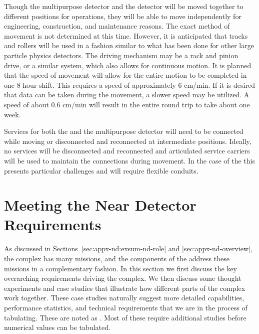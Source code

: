 Though the multipurpose detector and the  detector will be moved together to different positions for operations, they will be able to move independently for engineering, construction, and maintenance reasons.  The exact method of movement is not determined at this time. However, it is anticipated that tracks and rollers will be used in a fashion similar to what has been done for other large particle physics detectors. The driving mechanism may be a rack and pinion drive, or a similar system, which also allows for continuous motion. 
It is planned that the speed of movement will allow for the entire motion to be completed in one 8-hour shift. This requires a speed of approximately 6 cm/min. If it is desired that data can be taken during the movement, a slower speed may be utilized. A speed of about 0.6 cm/min will result in the entire round trip to take about one week. 

Services for both the  and the multipurpose detector will need to be connected while moving or disconnected and reconnected at intermediate positions. Ideally, no services will be disconnected and reconnected and articulated service carriers will be used to maintain the connections during movement. In the case of the  this presents particular challenges and will require flexible conduits. 




\chapter{Meeting the Near Detector Requirements}
\label{sec:appx-nd:requirements}

As discussed in Sections~\ref{sec:appx-nd:exsum-nd-role} and \ref{sec:appx-nd-overview}, the    complex has many missions, and the components of the    address these missions in a complementary fashion. In this section we first discuss the key overarching requirements driving the  complex. We then discuss some thought experiments and case studies that illustrate how different parts of the complex work together. These case studies naturally suggest more detailed capabilities, performance statistics, and technical requirements that we are in the process of tabulating. These are noted as . Most of these require additional studies before numerical values can be tabulated.


